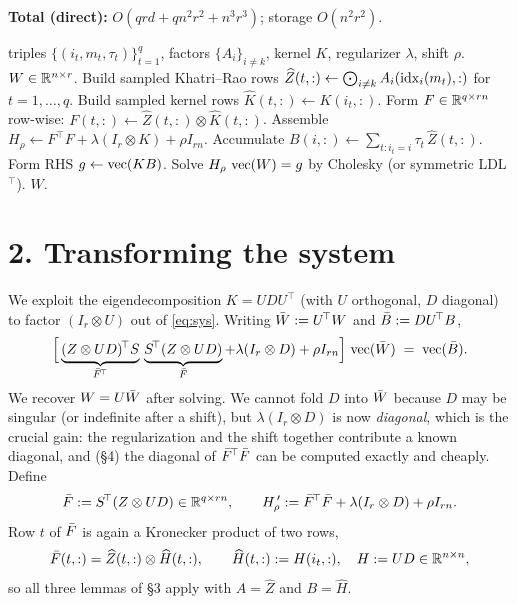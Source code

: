 \documentclass[11pt]{article}
\begin{document}
\medskip
\noindent\textbf{Total (direct):} $O(qrd+qn^2r^2+n^3r^3)$; storage $O(n^2r^2)$.

\begin{algorithm}[H]
\caption{Direct symmetric solve for the RKHS mode-$k$ subproblem}
\begin{algorithmic}[1]
\Require triples $\{(i_t,m_t,\tau_t)\}_{t=1}^q$, factors $\{A_i\}_{i\ne k}$,
         kernel $K$, regularizer $\lambda$, shift $\rho$.
\Ensure $W\in\mathbb{R}^{n\times r}$.
\State Build sampled Khatri--Rao rows
      $\widehat Z(t,:)\gets\bigodot_{i\ne k}A_i(\mathrm{idx}_i(m_t),:)$ for $t=1,\dots,q$.
\State Build sampled kernel rows $\widehat K(t,:)\gets K(i_t,:)$.
\State Form $F\in\mathbb{R}^{q\times rn}$ row-wise:
      $F(t,:)\gets \widehat Z(t,:)\otimes \widehat K(t,:)$.
\State Assemble
      $H_\rho\gets F^{\!\top}F+\lambda(I_r\otimes K)+\rho I_{rn}$.
\State Accumulate $B(i,:)\gets\sum_{t:i_t=i}\tau_t\,\widehat Z(t,:)$.
\State Form RHS $g\gets\operatorname{vec}(KB)$.
\State Solve $H_\rho\,\operatorname{vec}(W)=g$ by Cholesky (or symmetric LDL$^\top$).
\State \Return $W$.
\end{algorithmic}
\end{algorithm}

\section*{2. Transforming the system}

We exploit the eigendecomposition $K=UDU^{\!\top}$ (with $U$ orthogonal, $D$
diagonal) to factor $(I_r\otimes U)$ out of \eqref{eq:sys}. Writing
$\bar W:=U^{\!\top}W$ and $\bar B:=DU^{\!\top}B$,
\begin{equation}\label{eq:transformed}
  \Bigl[\,\underbrace{(Z\otimes UD)^{\!\top}S}_{\bar F^{\!\top}}\,
          \underbrace{S^{\!\top}(Z\otimes UD)}_{\bar F}
        + \lambda(I_r\otimes D) + \rho I_{rn}\Bigr]\,\operatorname{vec}(\bar W)
   \;=\; \operatorname{vec}(\bar B).
\end{equation}
We recover $W=U\bar W$ after solving. We cannot fold $D$ into $\bar W$ because $D$
may be singular (or indefinite after a shift), but $\lambda(I_r\otimes D)$ is
now \emph{diagonal}, which is the crucial gain: the regularization and the
shift together contribute a known diagonal, and (\S4) the diagonal of
$\bar F^{\!\top}\bar F$ can be computed exactly and cheaply. Define
\[
  \bar F := S^{\!\top}(Z\otimes UD)\in\mathbb{R}^{q\times rn},
  \qquad H_\rho^{\,\prime}:=\bar F^{\!\top}\bar F+\lambda(I_r\otimes D)+\rho I_{rn}.
\]
Row $t$ of $\bar F$ is again a Kronecker product of two rows,
\begin{equation}\label{eq:Fbar-rows}
  \bar F(t,:)=\widehat Z(t,:)\otimes \widehat H(t,:),
  \qquad \widehat H(t,:):=H(i_t,:),\quad H:=UD\in\mathbb{R}^{n\times n},
\end{equation}
so all three lemmas of \S3 apply with $A=\widehat Z$ and $B=\widehat H$.
\end{document}
